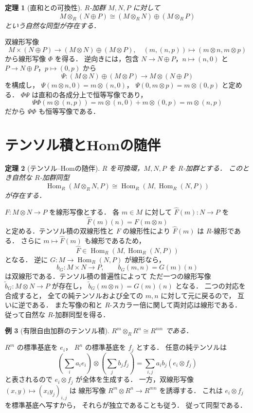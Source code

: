 \documentclass[a5paper,10pt,onecolumn]{jsarticle}
\makeatletter
\theoremstyle{mathnotetheorem}
\newtheorem{theorem}{定理}[section]
\newtheorem{example}[theorem]{例}
\renewcommand{\proofname}{証明}
\renewenvironment{proof}[1][\proofname]{%
  \par\pushQED{\qed}\normalfont\topsep4\p@\@plus2\p@\relax
  \trivlist\item[\hskip\labelsep\bfseries #1]\ignorespaces
}{\popQED\endtrivlist\@endpefalse}
\makeatother
\begin{document}
\begin{theorem}[直和との可換性]\label{thm:tensor-sum}
$R$-加群 $M,N,P$ に対して
\[
 M\otimes_R(N\oplus P)
 \cong(M\otimes_RN)\oplus(M\otimes_RP)
\]
という自然な同型が存在する．
\end{theorem}
\begin{proof}
双線形写像
\[
 M\times(N\oplus P)\to
 (M\otimes N)\oplus(M\otimes P),\quad
 (m,(n,p))\mapsto(m\otimes n,m\otimes p)
\]
から線形写像 $\Phi$ を得る．
逆向きには，包含
$N\to N\oplus P$，$n\mapsto(n,0)$ と
$P\to N\oplus P$，$p\mapsto(0,p)$ から
\[
 \Psi:(M\otimes N)\oplus(M\otimes P)
 \to M\otimes(N\oplus P)
\]
を構成し，
$\Psi(m\otimes n,0)=m\otimes(n,0)$，
$\Psi(0,m\otimes p)=m\otimes(0,p)$ と定める．
$\Phi\Psi$ は直和の各成分上で恒等写像であり，
\[
 \Psi\Phi(m\otimes(n,p))
 =m\otimes(n,0)+m\otimes(0,p)
 =m\otimes(n,p)
\]
だから $\Psi\Phi$ も恒等写像である．
\end{proof}

\section{テンソル積とHomの随伴}

\begin{theorem}[テンソル--Homの随伴]\label{thm:tensor-hom}
$R$ を可換環，$M,N,P$ を $R$-加群とする．
このとき自然な $R$-加群同型
\[
 \operatorname{Hom}_R(M\otimes_RN,P)
 \cong\operatorname{Hom}_R(M,\operatorname{Hom}_R(N,P))
\]
が存在する．
\end{theorem}
\begin{proof}
$F:M\otimes N\to P$ を線形写像とする．
各 $m\in M$ に対して
$\widehat F(m):N\to P$ を
\[
 \widehat F(m)(n)=F(m\otimes n)
\]
と定める．テンソル積の双線形性と $F$ の線形性により
$\widehat F(m)$ は $R$-線形である．
さらに $m\mapsto\widehat F(m)$ も線形であるため，
\[
 \widehat F\in
 \operatorname{Hom}_R(M,\operatorname{Hom}_R(N,P))
\]
となる．
逆に $G:M\to\operatorname{Hom}_R(N,P)$ が線形なら，
\[
 b_G:M\times N\to P,\qquad b_G(m,n)=G(m)(n)
\]
は双線形である．テンソル積の普遍性によって
ただ一つの線形写像
$\widetilde b_G:M\otimes N\to P$ が存在し，
$\widetilde b_G(m\otimes n)=G(m)(n)$ となる．
二つの対応を合成すると，
全ての純テンソルおよび全ての $m,n$ に対して元に戻るので，
互いに逆である．
また写像の和と $R$-スカラー倍に関して両対応は線形である．
従って自然な $R$-加群同型を得る．
\end{proof}

\begin{example}[有限自由加群のテンソル積]
$R^m\otimes_RR^n\cong R^{mn}$ である．
\end{example}
\begin{proof}
$R^m$ の標準基底を $e_i$，
$R^n$ の標準基底を $f_j$ とする．
任意の純テンソルは
\[
 \left(\sum_i a_ie_i\right)\otimes
 \left(\sum_j b_jf_j\right)
 =\sum_{i,j}a_ib_j(e_i\otimes f_j)
\]
と表されるので $e_i\otimes f_j$ が全体を生成する．
一方，双線形写像
$(x,y)\mapsto(x_iy_j)_{i,j}$ は
線形写像 $R^m\otimes R^n\to R^{mn}$ を誘導する．
これは $e_i\otimes f_j$ を標準基底へ写すから，
それらが独立であることも従う．
従って同型である．
\end{proof}
\end{document}
